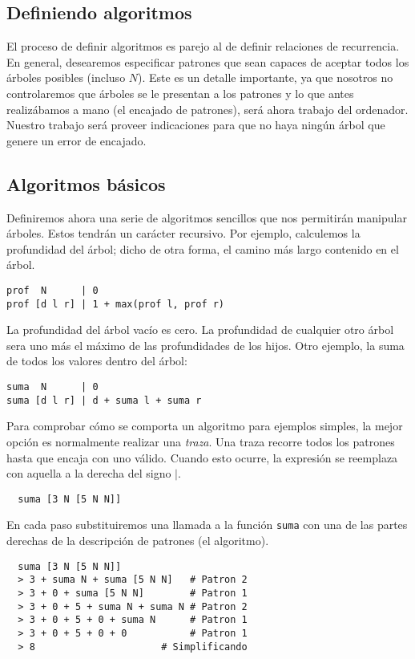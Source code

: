 \documentclass[10pt,spanish,twocolumn]{article}
\begin{document}
\subsection{Definiendo algoritmos}
El proceso de definir algoritmos es parejo al de definir relaciones de 
recurrencia.  En general, desearemos especificar patrones que sean capaces de 
aceptar todos los árboles posibles (incluso $N$).  Este es un detalle 
importante, ya que nosotros no controlaremos que árboles se le presentan a los 
patrones y lo que antes realizábamos a mano (el encajado de patrones), será 
ahora trabajo del ordenador.  Nuestro trabajo será proveer indicaciones para 
que no haya ningún árbol que genere un error de encajado.

\subsection{Algoritmos básicos}
Definiremos ahora una serie de algoritmos sencillos que nos permitirán 
manipular árboles.  Estos tendrán un carácter recursivo.  Por ejemplo, 
calculemos la profundidad del árbol; dicho de otra forma, el camino más largo 
contenido en el árbol.

\begin{lstlisting}
prof  N      | 0
prof [d l r] | 1 + max(prof l, prof r)
\end{lstlisting}

La profundidad del árbol vacío es cero.  La profundidad de cualquier otro árbol 
sera uno más el máximo de las profundidades de los hijos.  Otro ejemplo, la 
suma de todos los valores dentro del árbol:

\begin{lstlisting}
suma  N      | 0
suma [d l r] | d + suma l + suma r
\end{lstlisting}

Para comprobar cómo se comporta un algoritmo para ejemplos simples, la mejor 
opción es normalmente realizar una \emph{traza}.  Una traza recorre todos los 
patrones hasta que encaja con uno válido.  Cuando esto ocurre, la expresión se 
reemplaza con aquella a la derecha del signo $|$.

\begin{lstlisting}
  suma [3 N [5 N N]]
\end{lstlisting}

En cada paso substituiremos una llamada a la función \texttt{suma} con una de 
las partes derechas de la descripción de patrones (el algoritmo).

\begin{lstlisting}
  suma [3 N [5 N N]]
  > 3 + suma N + suma [5 N N]   # Patron 2
  > 3 + 0 + suma [5 N N]        # Patron 1
  > 3 + 0 + 5 + suma N + suma N # Patron 2
  > 3 + 0 + 5 + 0 + suma N      # Patron 1
  > 3 + 0 + 5 + 0 + 0           # Patron 1
  > 8                      # Simplificando
\end{lstlisting}
\end{document}
